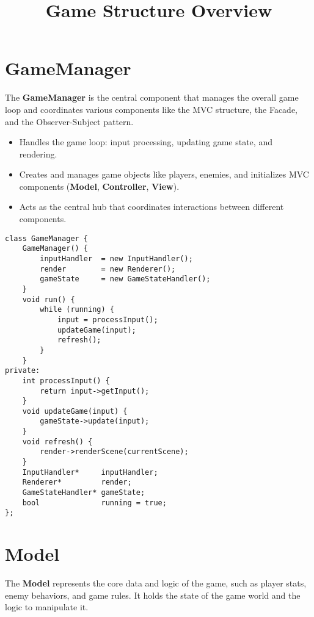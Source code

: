 \documentclass{article}
\title{Game Structure Overview}
\author{}
\date{}
\begin{document}
\maketitle

\section{GameManager}
The \textbf{GameManager} is the central component that manages the overall game loop and coordinates various components like the MVC structure, the Facade, and the Observer-Subject pattern.

\begin{itemize}
    \item Handles the game loop: input processing, updating game state, and rendering.
    \item Creates and manages game objects like players, enemies, and initializes MVC components (\textbf{Model}, \textbf{Controller}, \textbf{View}).
    \item Acts as the central hub that coordinates interactions between different components.
\end{itemize}

\begin{center}
    \begin{minipage}[c]{0.5\textwidth}
        \begin{verbatim}
class GameManager {
    GameManager() {
        inputHandler  = new InputHandler();
        render        = new Renderer();
        gameState     = new GameStateHandler();
    }
    void run() {
        while (running) {
            input = processInput();
            updateGame(input);
            refresh();
        }
    }
private:
    int processInput() {
        return input->getInput();
    }
    void updateGame(input) {
        gameState->update(input);
    }
    void refresh() {
        render->renderScene(currentScene);
    }
    InputHandler*     inputHandler;
    Renderer*         render;
    GameStateHandler* gameState;
    bool              running = true;
};
        \end{verbatim}
    \end{minipage}
\end{center}

\section{Model}
The \textbf{Model} represents the core data and logic of the game, such as player stats, enemy behaviors, and game rules. It holds the state of the game world and the logic to manipulate it.
\end{document}
